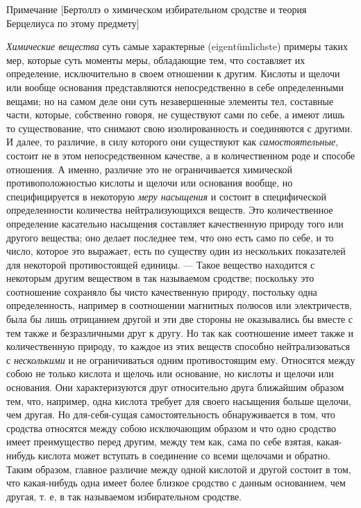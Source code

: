 {\centering
Примечание
[Бертоллэ о химическом избирательном сродстве и теория Берцелиуса по этому
предмету]
\par}

{\em Химические вещества} суть самые характерные
(eigentümlichste) примеры таких мер, которые суть моменты меры, обладающие
тем, что составляет их определение, исключительно в своем отношении к
другим. Кислоты и щелочи или вообще основания представляются
непосредственно в себе определенными вещами; но на самом деле они суть
незавершенные элементы тел, составные части, которые, собственно говоря, не
существуют сами по себе, а имеют лишь то существование, что снимают свою
изолированность и соединяются с другими. И далее, то различие, в силу
которого они существуют как {\em самостоятельные},
состоит не в этом непосредственном качестве, а в количественном роде и
способе отношения. А именно, различие это не ограничивается химической
противоположностью кислоты и щелочи или основания вообще, но
специфицируется в некоторую {\em меру насыщения} и
состоит в специфической определенности количества нейтрализующихся веществ.
Это количественное определение касательно насыщения составляет качественную
природу того или другого вещества; оно делает последнее тем, что оно есть
само по себе, и то число, которое это выражает, есть по существу один из
нескольких показателей для некоторой противостоящей единицы. — Такое
вещество находится с некоторым другим веществом в так называемом сродстве;
поскольку это соотношение сохраняло бы чисто качественную природу,
постольку одна определенность, например в соотношении магнитных полюсов или
электричеств, была бы лишь отрицанием другой и эти две стороны не
оказывались бы вместе с тем также и безразличными друг к другу. Но так как
соотношение имеет также и количественную природу, то каждое из этих веществ
способно нейтрализоваться с {\em несколькими} и не
ограничиваться одним противостоящим ему. Относятся между собою не только
кислота и щелочь или основание, но кислоты и щелочи или основания. Они
характеризуются друг относительно друга ближайшим образом тем, что,
например, одна кислота требует для своего насыщения больше щелочи, чем
другая. Но для-себя-сущая самостоятельность обнаруживается в том, что
сродства относятся между собою исключающим образом и что одно сродство
имеет преимущество перед другим, между тем как, сама по себе взятая,
какая-нибудь кислота может вступать в соединение со всеми щелочами и
обратно. Таким образом, главное различие между одной кислотой и другой
состоит в том, что какая-нибудь одна имеет более близкое сродство с данным
основанием, чем другая, т. е, в так называемом избирательном сродстве.

